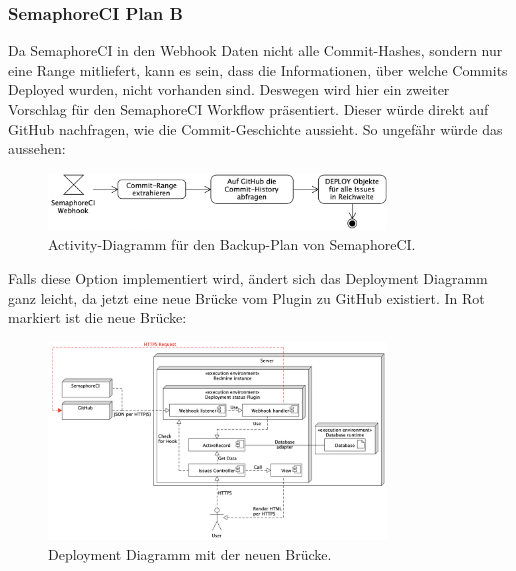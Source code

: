 \subsubsection{SemaphoreCI Plan B}
Da SemaphoreCI in den Webhook Daten nicht alle Commit-Hashes, sondern nur eine Range mitliefert, kann es sein, dass die
Informationen, über welche Commits Deployed wurden, nicht vorhanden sind. Deswegen wird hier ein zweiter Vorschlag für den
SemaphoreCI Workflow präsentiert. Dieser würde direkt auf GitHub nachfragen, wie die Commit-Geschichte aussieht. So
ungefähr würde das aussehen:
\begin{figure}[H]
  \centering
  \includegraphics[width=0.8\textwidth]{images/activity/semaphore-backup-hooks.png}
  \caption[Ein Activity-Diagramm, welches den Backup-Plan für SemaphoreCI aufzeigt.]{Activity-Diagramm für den Backup-Plan von SemaphoreCI.}
  \label{fig:activity_plan_b}
\end{figure}
Falls diese Option implementiert wird, ändert sich das Deployment Diagramm ganz leicht, da jetzt
eine neue Brücke vom Plugin zu GitHub existiert. In Rot markiert ist die neue Brücke:
\begin{figure}[H]
  \centering
  \includegraphics[width=0.8\textwidth]{images/deployment/backup-hooks.png}
  \caption[Das Deployment Diagramm aus \ref{fig:deployment-diagram} mit der neuen Brücke in Rot gekennzeichnet.]{Deployment Diagramm mit der neuen Brücke.}
  \label{fig:activity_plan_b_deployment}
\end{figure}

